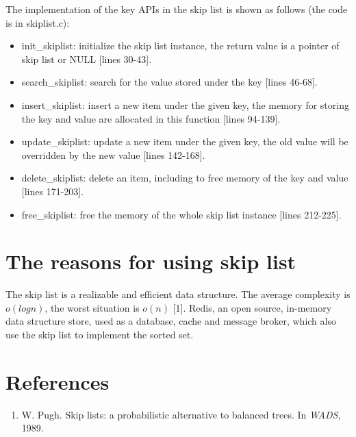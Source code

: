 \documentclass[10pt, a4paper]{article}
\begin{document}
The implementation of the key APIs in the skip list is shown as follows (the code is in skiplist.c):

\begin{itemize}
    \item init\_skiplist: initialize the skip list instance, the return value is a pointer of skip list or NULL [lines 30-43].
    \item search\_skiplist: search for the value stored under the key [lines 46-68].
    \item insert\_skiplist: insert a new item under the given key, the memory for storing the key and value are allocated in this function [lines 94-139].
    \item update\_skiplist: update a new item under the given key, the old value will be overridden by the new value [lines 142-168].
    \item delete\_skiplist: delete an item, including to free memory of the key and value [lines 171-203].
    \item free\_skiplist: free the memory of the whole skip list instance [lines 212-225].
\end{itemize}

\section{The reasons for using skip list}

The skip list is a realizable and efficient data structure. The average complexity is $o(logn)$, the worst situation is $o(n)$ [1]. Redis, an open source, in-memory data structure store, used as a database, cache and message broker, which also use the skip list to implement the sorted set.

\section{References}
    
\begin{enumerate}
    \item W. Pugh. Skip lists: a probabilistic alternative to balanced trees. In \textit{WADS}, 1989.
\end{enumerate}


		
\end{document}
